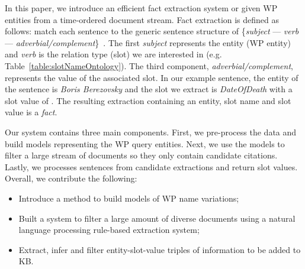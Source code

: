 In this paper, we introduce an efficient fact extraction system or given WP entities from a time-ordered document stream.
Fact extraction is defined as follows: match each sentence to the generic sentence structure of \{\textit{subject} --- \textit{verb} --- \textit{adverbial/complement}\}~\cite{sentencePatterns08}.
The first \textit{subject} represents the entity (WP entity) and \textit{verb} is the relation type (slot) we are interested in (e.g. Table~\ref{table:slotNameOntology}).
The third component, \textit{adverbial/complement}, represents the value of the associated slot.
In our example sentence, the entity of the sentence is \textit{Boris Berezovsky} and the slot we extract is
\textit{DateOfDeath} with a slot value of .
The resulting extraction containing an entity, slot name and slot value is a \emph{fact}.




Our system contains three main components.
First, we pre-process the data and build models representing the WP query entities.
Next, we use the models to filter a large stream of documents so they only contain candidate citations.
Lastly, we processes sentences from candidate extractions and return slot values. 
Overall, we contribute the following:
\begin{itemize}[noitemsep,nolistsep]
\item Introduce a method to build models of WP name variations;%
\item Built a system to filter a large amount of diverse documents using a natural language processing rule-based extraction system;%
\item Extract, infer and filter entity-slot-value triples of information to be added to KB.%
\end{itemize}


